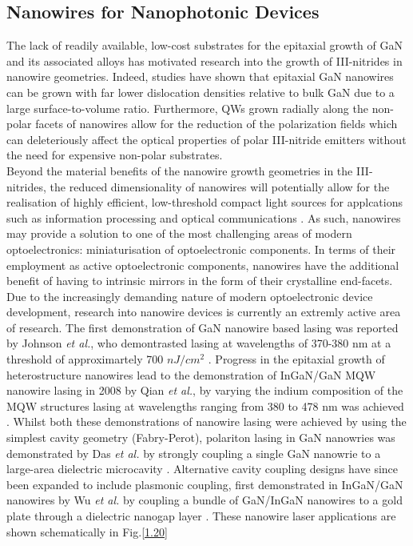 \subsection{Nanowires for Nanophotonic Devices}
The lack of readily available, low-cost substrates for the epitaxial growth of GaN and its associated alloys has motivated research into the growth of III-nitrides in nanowire geometries. Indeed, studies have shown that epitaxial GaN nanowires can be grown with far lower dislocation densities relative to bulk GaN due to a large surface-to-volume ratio. Furthermore, QWs grown radially along the non-polar facets of nanowires allow for the reduction of the polarization fields which can deleteriously affect the optical properties of polar III-nitride emitters without the need for expensive non-polar substrates.\\
Beyond the material benefits of the nanowire growth geometries in the III-nitrides, the reduced dimensionality of nanowires will potentially allow for the realisation of highly efficient, low-threshold  compact light sources for applcations such as information processing and optical communications \cite{Arafin2013}. As such, nanowires may provide a solution to one of the most challenging areas of modern optoelectronics: miniaturisation of optoelectronic components. In terms of their employment as active optoelectronic components, nanowires have the additional benefit of having to intrinsic mirrors in the form of their crystalline end-facets. Due to the increasingly demanding nature of modern optoelectronic device development, research into nanowire devices is currently an extremly active area of research.
The first demonstration of GaN nanowire based lasing was reported by Johnson {\it et al.}, who demontrasted lasing at wavelengths of 370-380 nm at a threshold of approximartely 700 $nJ/cm^2$ \cite{Johnson2002}. Progress in the epitaxial growth of heterostructure nanowires lead to the demonstration of InGaN/GaN MQW nanowire lasing in 2008 by Qian {\it et al.}, by varying the indium composition of the MQW structures lasing at wavelengths ranging from 380 to 478 nm was achieved \cite{Qian2008}. Whilst both these demonstrations of nanowire lasing were achieved by using the simplest cavity geometry (Fabry-Perot), polariton lasing in GaN nanowries was demonstrated by Das {\it et al.} by strongly coupling a single GaN nanowrie to a large-area dielectric microcavity \cite{Das2011}. Alternative cavity coupling designs have since been expanded to include plasmonic coupling, first demonstrated in InGaN/GaN nanowires by Wu {\it et al.} by coupling a bundle of GaN/InGaN nanowires to a gold plate through a dielectric nanogap layer \cite{Wu2011}. These nanowire laser applications are shown schematically in Fig.\ref{1.20}

